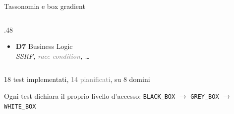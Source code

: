 \begin{frame}{Tassonomia e box gradient}
\begin{columns}
\begin{column}{.48\textwidth}
\begin{itemize}
                        \item \textbf{D7} \alert{Business Logic}\\
                              {\scriptsize\itshape SSRF, \textcolor{gray}{race condition}, \dots}
                  \end{itemize}
            \end{column}
      \end{columns}

      \vspace{0.4em}
      \begin{center}
            \small \alert{18 test implementati}, \textcolor{gray}{14 pianificati}, su 8 domini
      \end{center}

      \begin{center}
            \small Ogni \alert{test} dichiara il proprio livello d'accesso: \texttt{BLACK\_BOX} $\rightarrow$ \texttt{GREY\_BOX} $\rightarrow$ \texttt{WHITE\_BOX}
      \end{center}
\end{frame}